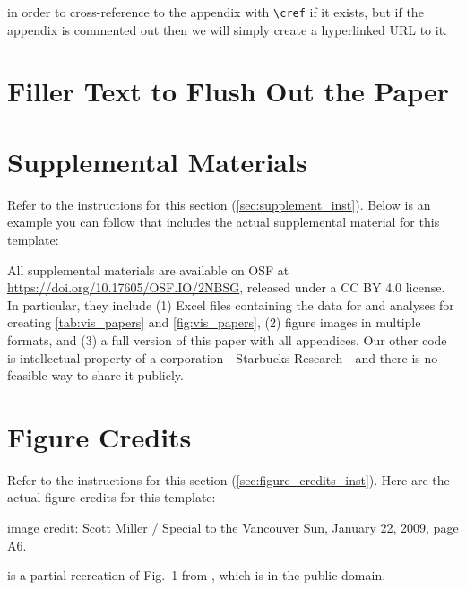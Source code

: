 \documentclass[journal]{vgtc}                %
\begin{document}
in order to cross-reference to the appendix with \verb|\cref| if it exists, but if the appendix is commented out then we will simply create a hyperlinked URL to it.


\section{Filler Text to Flush Out the Paper}

\lipsum[1-3]%



\section*{Supplemental Materials}
\label{sec:supplemental_materials}

Refer to the instructions for this section (\cref{sec:supplement_inst}).
Below is an example you can follow that includes the actual supplemental material for this template:

All supplemental materials are available on OSF at \url{https://doi.org/10.17605/OSF.IO/2NBSG}, released under a CC BY 4.0 license.
In particular, they include (1) Excel files containing the data for and analyses for creating \cref{tab:vis_papers} and \cref{fig:vis_papers}, (2) figure images in multiple formats, and (3) a full version of this paper with all appendices.
Our other code is intellectual property of a corporation---Starbucks Research---and there is no feasible way to share it publicly.


\section*{Figure Credits}
\label{sec:figure_credits}

Refer to the instructions for this section (\cref{sec:figure_credits_inst}).
Here are the actual figure credits for this template:

 image credit: Scott Miller / Special to the Vancouver Sun, January 22, 2009, page A6.

 is a partial recreation of Fig.\ 1 from \cite{Isenberg:2017:VMC}, which is in the public domain.


\end{document}
